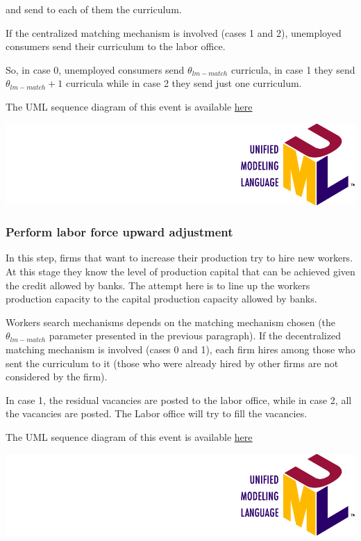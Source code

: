 \documentclass{book}
\newcommand{\umllocation}{file:///Users/giulioni/Dropbox/svn/sfcabm_my/documentation}
\begin{document}
\vskip3mm
and send to each of them the curriculum.

If the centralized matching mechanism is involved (cases 1 and 2), unemployed consumers send their curriculum to the labor office.

So, in case 0, unemployed consumers send $\theta_{lm-match}$ curricula, in case 1 they send $\theta_{lm-match}+1$ curricula while in case 2 they send just one curriculum.



\vskip3mm
The UML sequence diagram of this event is available \href{\umllocation/sendJobApplications.html}{here}
\begin{marginfigure}
	\includegraphics[scale=0.1]{uml.png}
\end{marginfigure}


\subsubsection{Perform labor force upward adjustment}

In this step, firms that want to increase their production try to hire new workers. At this stage they know the level of production capital that can be achieved given the credit allowed by banks. The attempt here is to line up the workers production capacity to the capital production capacity allowed by banks.

Workers search mechanisms depends on the matching mechanism chosen (the $\theta_{lm-match}$ parameter presented in the previous paragraph).
If the decentralized matching mechanism is involved (cases 0 and 1), each firm hires among those who sent the curriculum to it (those who were already hired by other firms are not considered by the firm).

In case 1, the residual vacancies are posted to the labor office, while in case 2, all the vacancies are posted. The Labor office will try to fill the vacancies. 

\vskip3mm
The UML sequence diagram of this event is available \href{\umllocation/laborForceUpwardAdjustment.html}{here}
\begin{marginfigure}
	\includegraphics[scale=0.1]{uml.png}
\end{marginfigure}
\end{document}
